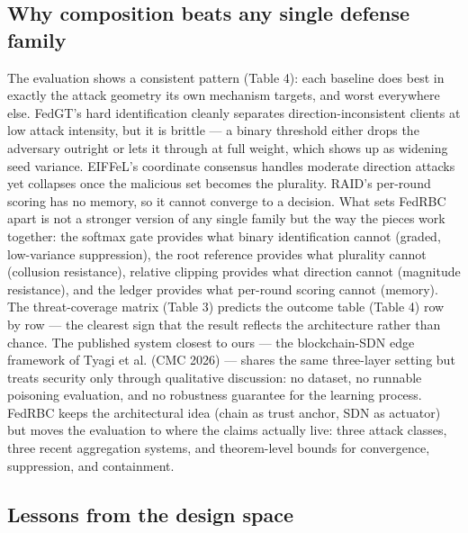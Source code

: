\documentclass[cmc,article,submit,moreauthors,pdftex]{Definitions/tsp}
\begin{document}
\subsection{Why composition beats any single defense family}\label{sec:why-composition-beats-any-single-defense-family}

The evaluation shows a consistent pattern (Table 4): each baseline does best in exactly the attack geometry its own mechanism targets, and worst everywhere else. FedGT's hard identification cleanly separates direction-inconsistent clients at low attack intensity, but it is brittle --- a binary threshold either drops the adversary outright or lets it through at full weight, which shows up as widening seed variance. EIFFeL's coordinate consensus handles moderate direction attacks yet collapses once the malicious set becomes the plurality. RAID's per-round scoring has no memory, so it cannot converge to a decision. What sets FedRBC apart is not a stronger version of any single family but the way the pieces work together: the softmax gate provides what binary identification cannot (graded, low-variance suppression), the root reference provides what plurality cannot (collusion resistance), relative clipping provides what direction cannot (magnitude resistance), and the ledger provides what per-round scoring cannot (memory). The threat-coverage matrix (Table 3) predicts the outcome table (Table 4) row by row --- the clearest sign that the result reflects the architecture rather than chance. The published system closest to ours --- the blockchain-SDN edge framework of Tyagi et al. (CMC 2026) \cite{ref-51} --- shares the same three-layer setting but treats security only through qualitative discussion: no dataset, no runnable poisoning evaluation, and no robustness guarantee for the learning process. FedRBC keeps the architectural idea (chain as trust anchor, SDN as actuator) but moves the evaluation to where the claims actually live: three attack classes, three recent aggregation systems, and theorem-level bounds for convergence, suppression, and containment.

\subsection{Lessons from the design space}\label{sec:lessons-from-the-design-space}
\end{document}
